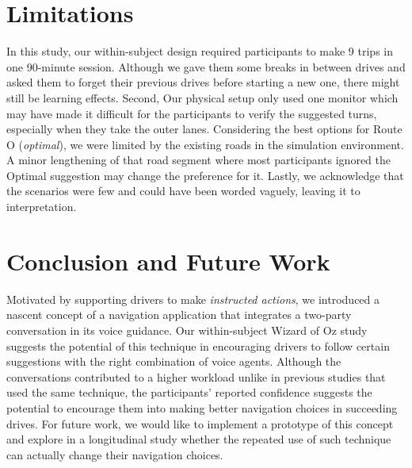 \section{Limitations}
In this study, our within-subject design required participants to make 9 trips in one 90-minute session. Although we gave them some breaks in between drives and asked them to forget their previous drives before starting a new one, there might still be learning effects. Second, Our physical setup only used one monitor which may have made it difficult for the participants to verify the suggested turns, especially when they take the outer lanes. Considering the best options for Route O (\textit{optimal}), we were limited by the existing roads in the simulation environment. A minor lengthening of that road segment where most participants ignored the Optimal suggestion may change the preference for it. Lastly, we acknowledge that the scenarios were few and could have been worded vaguely, leaving it to interpretation.

\section{Conclusion and Future Work}
Motivated by supporting drivers to make \textit{instructed actions}, we introduced a nascent concept of a navigation application that integrates a two-party conversation in its voice guidance. Our within-subject Wizard of Oz study suggests the potential of this technique in encouraging drivers to follow certain suggestions with the right combination of voice agents. Although the conversations contributed to a higher workload unlike in previous studies that used the same technique, the participants' reported confidence suggests the potential to encourage them into making better navigation choices in succeeding drives. For future work, we would like to implement a prototype of this concept and explore in a longitudinal study whether the repeated use of such technique can actually change their navigation choices. 